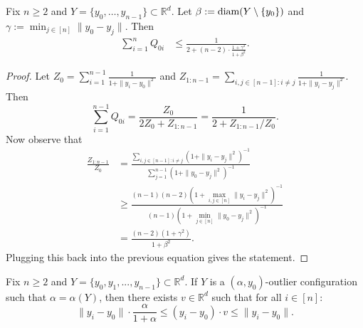 \begin{lemma}\label{lem:Qsum_bound} Fix $n\geq 2$ and \(Y = \{y_0,\ldots,y_{n-1}\} \subset \mathbb{R}^d\). Let ${\beta := \operatorname*{diam}(Y\setminus \{y_0\})}$ and ${\gamma := \min_{j\in [n]} \|y_0-y_j\|}$. Then
\begin{align*}
    \sum_{i=1}^n Q_{0i} &\leq \frac{1}{2 + (n-2)\cdot \frac{1+\gamma^2}{1+\beta^2}} . %
\end{align*}
\end{lemma}
\begin{proof}
    Let \(Z_0 = \sum_{i=1}^{n-1} \frac{1}{1+\|y_i-y_0\|^2}\) and \(Z_{1:n-1} = \sum_{i, j \in [n-1]: i\neq j}  \frac{1}{1+\|y_i-y_j\|^2}\). Then
    \[\sum_{i=1}^{n-1} Q_{0i} = \frac{Z_0}{2Z_0 + Z_{1:n-1}} = \frac{1}{2 + Z_{1:n-1}/Z_0}.\]
Now observe that
\begin{align*}
    \frac{Z_{1:n-1}}{Z_0} &= \frac{\sum_{i,j\in [n-1]:i\neq j} (1 + \|y_i-y_j\|^2)^{-1}}{\sum_{j=1}^{n-1} (1 + \|y_0 -y_j\|^2)^{-1}}  \\
 &\geq \frac{(n-1)(n-2)(1+\max_{i,j \in[n]} \|y_i-y_j\|^2)^{-1}}{(n-1)(1+\min_{j \in[n]} \|y_0-y_j\|^2)^{-1}}  \\
  &= \frac{(n-2)(1+\gamma^2)}{1+\beta^2}.  %
\end{align*}
Plugging this back into the previous equation gives the statement. 
\end{proof}


\begin{lemma}\label{lem:r_split}
    Fix \(n\geq 2\) and \(Y = \{y_0,y_1,...,y_{n-1}\} \subset \mathbb{R}^d\). If \(Y\) is a \((\alpha, y_0)\)-outlier configuration such that $\alpha = \alpha(Y)$, then there exists $v \in \mathbb{R}^d$ such that for all $i \in [n]$:
    \[\|y_i-y_0\| \cdot \frac{ \alpha}{{1+\alpha}%
    } \leq (y_i - y_0)\cdot v \leq \|y_i-y_0\|.\]
\end{lemma}

